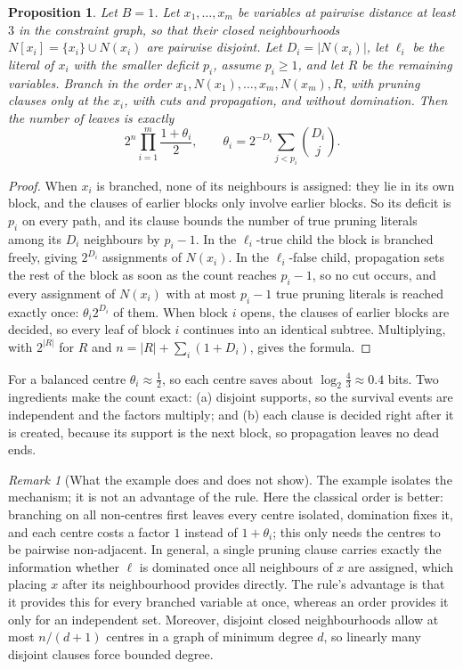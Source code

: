\documentclass[11pt,a4paper]{article}
\newtheorem{proposition}[theorem]{Proposition}
\theoremstyle{remark}
\newtheorem{remark}[theorem]{Remark}
\begin{document}
\begin{proposition}\label{prop:blocks}
Let $B=1$. Let $x_1,\dots,x_m$ be variables at pairwise distance at least $3$
in the constraint graph, so that their closed neighbourhoods
$N[x_i]=\{x_i\}\cup N(x_i)$ are pairwise disjoint. Let $D_i=|N(x_i)|$, let
$\ell_i$ be the literal of $x_i$ with the smaller deficit $p_i$, assume
$p_i\ge1$, and let $R$ be the remaining variables. Branch in the order
$x_1,N(x_1),\dots,x_m,N(x_m),R$, with pruning clauses only at the $x_i$, with
cuts and propagation, and without domination. Then the number of leaves is
exactly
\[
 2^n\prod_{i=1}^m\frac{1+\theta_i}{2},\qquad
 \theta_i=2^{-D_i}\sum_{j<p_i}\binom{D_i}{j}.
\]
\end{proposition}

\begin{proof}
When $x_i$ is branched, none of its neighbours is assigned: they lie in its own
block, and the clauses of earlier blocks only involve earlier blocks. So its
deficit is $p_i$ on every path, and its clause bounds the number of true
pruning literals among its $D_i$ neighbours by $p_i-1$. In the $\ell_i$-true
child the block is branched freely, giving $2^{D_i}$ assignments of $N(x_i)$.
In the $\ell_i$-false child, propagation sets the rest of the block as soon as
the count reaches $p_i-1$, so no cut occurs, and every assignment of $N(x_i)$
with at most $p_i-1$ true pruning literals is reached exactly once:
$\theta_i2^{D_i}$ of them. When block $i$ opens, the clauses of earlier blocks
are decided, so every leaf of block $i$ continues into an identical subtree.
Multiplying, with $2^{|R|}$ for $R$ and $n=|R|+\sum_i(1+D_i)$, gives the
formula.
\end{proof}

For a balanced centre $\theta_i\approx\frac12$, so each centre saves about
$\log_2\frac43\approx0.4$ bits. Two ingredients make the count exact: (a)
disjoint supports, so the survival events are independent and the factors
multiply; and (b) each clause is decided right after it is created, because its
support is the next block, so propagation leaves no dead ends.

\begin{remark}[What the example does and does not show]\label{rem:blocks}
The example isolates the mechanism; it is not an advantage of the rule. Here
the classical order is better: branching on all non-centres first leaves every
centre isolated, domination fixes it, and each centre costs a factor $1$
instead of $1+\theta_i$; this only needs the centres to be pairwise
non-adjacent. In general, a single pruning clause carries exactly the
information whether $\ell$ is dominated once all neighbours of $x$ are
assigned, which placing $x$ after its neighbourhood provides directly. The
rule's advantage is that it provides this for every branched variable at once,
whereas an order provides it only for an independent set. Moreover, disjoint
closed neighbourhoods allow at most $n/(d+1)$ centres in a graph of minimum
degree $d$, so linearly many disjoint clauses force bounded degree.
\end{remark}
\end{document}
